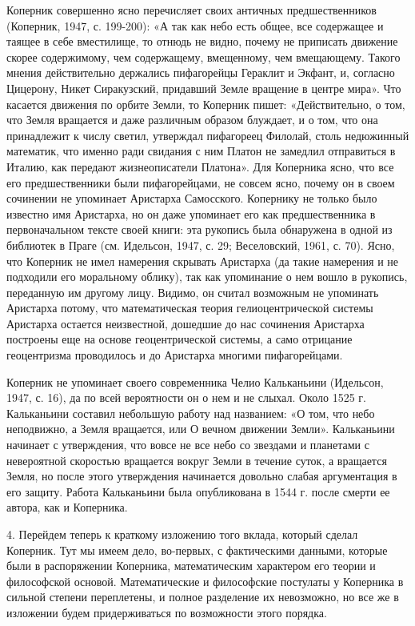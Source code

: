 Коперник совершенно ясно перечисляет своих античных предшественников
(Коперник, 1947, с. 199-200): «А так как небо есть общее, все
содержащее и таящее в себе вместилище, то отнюдь не видно, почему не
приписать движение скорее содержимому, чем содержащему, вмещенному,
чем вмещающему. Такого мнения действительно держались пифагорейцы
Гераклит и Экфант, и, согласно Цицерону, Никет Сиракузский, придавший
Земле вращение в центре мира». Что касается движения по орбите Земли,
то Коперник пишет: «Действительно, о том, что Земля вращается и даже
различным образом блуждает, и о том, что она принадлежит к числу
светил, утверждал пифагореец Филолай, столь недюжинный математик, что
именно ради свидания с ним Платон не замедлил отправиться в Италию,
как передают жизнеописатели Платона». Для Коперника ясно, что все
его предшественники были пифагорейцами, не совсем ясно, почему он в
своем сочинении не упоминает Аристарха Самосского. Копернику не только
было известно имя Аристарха, но он даже упоминает его как
предшественника в первоначальном тексте своей книги: эта рукопись была
обнаружена в одной из библиотек в Праге (см. Идельсон, 1947, с. 29;
Веселовский, 1961, с. 70). Ясно, что Коперник не имел намерения
скрывать Аристарха (да такие намерения и не подходили его моральному
облику), так как упоминание о нем вошло в рукопись, переданную им
другому лицу. Видимо, он считал возможным не упоминать Аристарха
потому, что математическая теория гелиоцентрической системы Аристарха
остается неизвестной, дошедшие до нас сочинения Аристарха построены
еще на основе геоцентрической системы, а само отрицание геоцентризма
проводилось и до Аристарха многими пифагорейцами.

Коперник не упоминает своего современника Челио Кальканьини (Идельсон,
1947, с. 16), да по всей вероятности он о нем и не слыхал. Около 1525
г. Кальканьини составил небольшую работу над названием: «О том, что
небо неподвижно, а Земля вращается, или О вечном движении Земли».
Кальканьини начинает с утверждения, что вовсе не все небо со
звездами и планетами с невероятной скоростью вращается вокруг Земли в
течение суток, а вращается Земля, но после этого утверждения
начинается довольно слабая аргументация в его защиту. Работа
Кальканьини была опубликована в 1544 г. после смерти ее автора, как и
Коперника.

4. Перейдем теперь к краткому изложению того вклада, который сделал
Коперник. Тут мы имеем дело, во-первых, с фактическими данными,
которые были в распоряжении Коперника, математическим характером его
теории и философской основой. Математические и философские постулаты у
Коперника в сильной степени переплетены, и полное разделение их
невозможно, но все же в изложении будем придерживаться по возможности
этого порядка.

